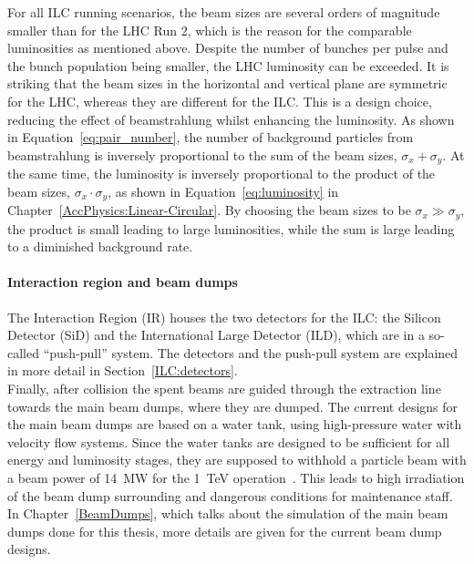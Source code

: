For all ILC running scenarios, the beam sizes are several orders of magnitude smaller than for the LHC Run 2, which is the reason for the comparable luminosities as mentioned above.
Despite the number of bunches per pulse and the bunch population being smaller, the LHC luminosity can be exceeded.
It is striking that the beam sizes in the horizontal and vertical plane are symmetric for the LHC, whereas they are different for the ILC.
This is a design choice, reducing the effect of beamstrahlung whilst enhancing the luminosity.
As shown in Equation~\ref{eq:pair_number}, the number of background particles from beamstrahlung is inversely proportional to the sum of the beam sizes, $\sigma_x+\sigma_y$.
At the same time, the luminosity is inversely proportional to the product of the beam sizes, $\sigma_x\cdot\sigma_y$, as shown in Equation~\ref{eq:luminosity} in Chapter~\ref{AccPhysics:Linear-Circular}.
By choosing the beam sizes to be $\sigma_x\gg\sigma_y$, the product is small leading to large luminosities, while the sum is large leading to a diminished background rate.

\paragraph{Interaction region and beam dumps}
The Interaction Region (IR) houses the two detectors for the ILC: the Silicon Detector (SiD) and the International Large Detector (ILD), which are in a so-called ``push-pull'' system.
The detectors and the push-pull system are explained in more detail in Section~\ref{ILC:detectors}.\\
Finally, after collision the spent beams are guided through the extraction line towards the main beam dumps, where they are dumped.
The current designs for the main beam dumps are based on a water tank, using high-pressure water with velocity flow systems.
Since the water tanks are designed to be sufficient for all energy and luminosity stages, they are supposed to withhold a particle beam with a beam power of \SI{14}{\mega\watt} for the \SI{1}{\TeV} operation~\cite[p. 18]{TDR32}.
This leads to high irradiation of the beam dump surrounding and dangerous conditions for maintenance staff.
In Chapter~\ref{BeamDumps}, which talks about the simulation of the main beam dumps done for this thesis, more details are given for the current beam dump designs.

